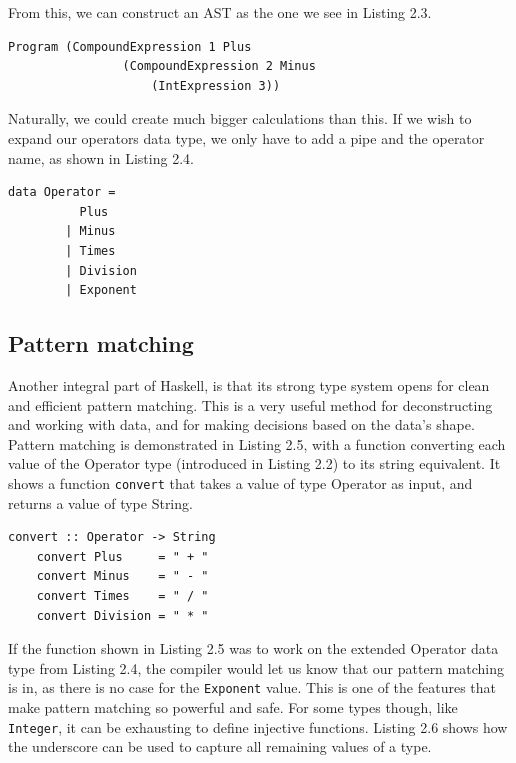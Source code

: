 From this, we can construct an AST as the one we see in Listing 2.3. \hfill \\

\begin{lstlisting}[caption={An AST constructed with data types presented in Listing 2.2}, captionpos=b, frame=tlrb]
    Program (CompoundExpression 1 Plus
                (CompoundExpression 2 Minus
                    (IntExpression 3))
\end{lstlisting}

Naturally, we could create much bigger calculations than this. If we wish to expand our operators data type, we only have to add a pipe and the operator name, as shown in Listing 2.4. \hfill \\

\begin{lstlisting}[caption={An extended version of the Operator data type presented in Listing 2.2}, captionpos=b, frame=tlrb]
    data Operator =
          Plus
        | Minus
        | Times
        | Division
        | Exponent
\end{lstlisting}

\subsection{Pattern matching}

Another integral part of Haskell, is that its strong type system opens for clean and efficient pattern matching. This is a very useful method for deconstructing and working with data, and for making decisions based on the data's shape. \hfill \\

Pattern matching is demonstrated in Listing 2.5, with a function converting each value of the Operator type (introduced in Listing 2.2) to its string equivalent. It shows a function \texttt{convert} that takes a value of type Operator as input, and returns a value of type String. \hfill \\

\begin{lstlisting}[caption={Haskell function converting values of one type to another}, captionpos=b, frame=tlrb]
    convert :: Operator -> String
    convert Plus     = " + "
    convert Minus    = " - "
    convert Times    = " / "
    convert Division = " * "
\end{lstlisting}

If the function shown in Listing 2.5 was to work on the extended Operator data type from Listing 2.4, the compiler would let us know that our pattern matching is in, as there is no case for the \texttt{Exponent} value. This is one of the features that make pattern matching so powerful and safe. For some types though, like \texttt{Integer}, it can be exhausting to define injective functions. Listing 2.6 shows how the underscore can be used to capture all remaining values of a type. \hfill \\


